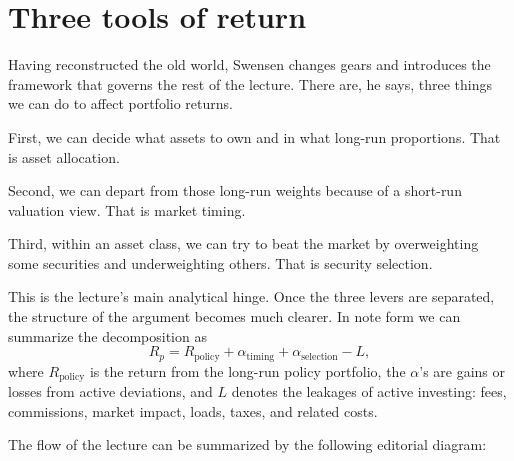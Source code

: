 \section{Three tools of return}

Having reconstructed the old world, Swensen changes gears and introduces the framework that governs the rest of the lecture. There are, he says, three things we can do to affect portfolio returns.

First, we can decide what assets to own and in what long-run proportions. That is asset allocation.

Second, we can depart from those long-run weights because of a short-run valuation view. That is market timing.

Third, within an asset class, we can try to beat the market by overweighting some securities and underweighting others. That is security selection.

This is the lecture's main analytical hinge. Once the three levers are separated, the structure of the argument becomes much clearer. In note form we can summarize the decomposition as
\begin{equation}
R_p = R_{\text{policy}} + \alpha_{\text{timing}} + \alpha_{\text{selection}} - L,
\end{equation}
where \(R_{\text{policy}}\) is the return from the long-run policy portfolio, the \(\alpha\)'s are gains or losses from active deviations, and \(L\) denotes the leakages of active investing: fees, commissions, market impact, loads, taxes, and related costs.

The flow of the lecture can be summarized by the following editorial diagram:
\begin{figure}[h]
\centering
{}
\end{figure}

